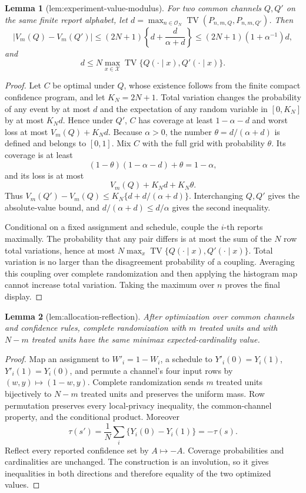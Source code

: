 \documentclass{article}
\newtheorem{lemma}{Lemma}
\begin{document}
\begin{lemma}[lem:experiment-value-modulus]\label{lem:experiment-value-modulus}
For two common channels \(Q,Q'\) on the same finite report alphabet, let \(d=\max_{n\in\mathcal O_N}\operatorname{TV}(P_{n,m,Q},P_{n,m,Q'})\).  Then
\[
 |V_m(Q)-V_m(Q')|\le(2N+1)\left\{d+\frac d{\alpha+d}\right\}
 \le(2N+1)(1+\alpha^{-1})d,
\]
and
\[
 d\le N\max_{x\in\mathcal X}\operatorname{TV}\{Q(\cdot\mid x),Q'(\cdot\mid x)\}.
\]
\end{lemma}
\begin{proof}
Let \(C\) be optimal under \(Q\), whose existence follows from the finite compact confidence program, and let \(K_N=2N+1\).  Total variation changes the probability of any event by at most \(d\) and the expectation of any random variable in \([0,K_N]\) by at most \(K_Nd\).  Hence under \(Q'\), \(C\) has coverage at least \(1-\alpha-d\) and worst loss at most \(V_m(Q)+K_Nd\).  Because \(\alpha>0\), the number \(\theta=d/(\alpha+d)\) is defined and belongs to \([0,1]\).  Mix \(C\) with the full grid with probability \(\theta\).  Its coverage is at least
\[
 (1-\theta)(1-\alpha-d)+\theta=1-\alpha,
\]
and its loss is at most
\[
 V_m(Q)+K_Nd+K_N\theta.
\]
Thus \(V_m(Q')-V_m(Q)\le K_N\{d+d/(\alpha+d)\}\).  Interchanging \(Q,Q'\) gives the absolute-value bound, and \(d/(\alpha+d)\le d/\alpha\) gives the second inequality.

Conditional on a fixed assignment and schedule, couple the \(i\)-th reports maximally.  The probability that any pair differs is at most the sum of the \(N\) row total variations, hence at most \(N\max_x\operatorname{TV}\{Q(\cdot\mid x),Q'(\cdot\mid x)\}\).  Total variation is no larger than the disagreement probability of a coupling.  Averaging this coupling over complete randomization and then applying the histogram map cannot increase total variation.  Taking the maximum over \(n\) proves the final display.
\end{proof}

\begin{lemma}[lem:allocation-reflection]\label{lem:allocation-reflection}
After optimization over common channels and confidence rules, complete randomization with \(m\) treated units and with \(N-m\) treated units have the same minimax expected-cardinality value.
\end{lemma}
\begin{proof}
Map an assignment to \(W'_i=1-W_i\), a schedule to \(Y'_i(0)=Y_i(1)\), \(Y'_i(1)=Y_i(0)\), and permute a channel's four input rows by \((w,y)\mapsto(1-w,y)\).  Complete randomization sends \(m\) treated units bijectively to \(N-m\) treated units and preserves the uniform mass.  Row permutation preserves every local-privacy inequality, the common-channel property, and the conditional product.  Moreover
\[
 \tau(s')=\frac1N\sum_i\{Y_i(0)-Y_i(1)\}=-\tau(s).
\]
Reflect every reported confidence set by \(A\mapsto-A\).  Coverage probabilities and cardinalities are unchanged.  The construction is an involution, so it gives inequalities in both directions and therefore equality of the two optimized values.
\end{proof}
\end{document}
